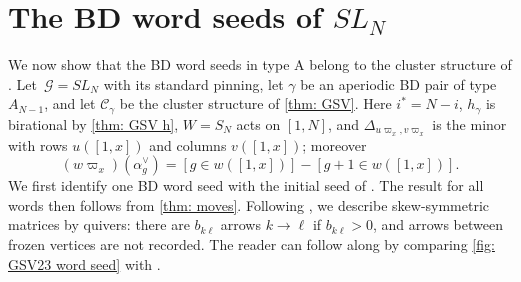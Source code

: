 \documentclass[a4paper]{amsart}
\numberwithin{equation}{section}
\theoremstyle{definition}
\theoremstyle{remark}
\newcommand{\mcG}{\mathcal{G}}
\newcommand{\mcC}{\mathcal{C}}
\begin{document}
\section{The BD word seeds of \texorpdfstring{$SL_N$}{SLN}}
\label{sec: type A}
We now show that the BD word seeds in type A belong to the cluster structure of \cite{GSV23}.
Let~$\mcG=SL_N$ with its standard pinning, let $\gamma$ be an aperiodic BD pair of type $A_{N-1}$, and let $\mcC_\gamma$ be the cluster structure of \cref{thm: GSV}.
Here $i^*=N-i$, $h_\gamma$ is birational by \cref{thm: GSV h}, $W=S_N$ acts on $[1,N]$, and $\Delta_{u\varpi_x,v\varpi_x}$ is the minor with rows $u([1,x])$ and columns $v([1,x])$; moreover
\begin{equation}
  \label{eq: pairing A}
  (w\varpi_x)(\alpha^\vee_g)=[g\in w([1,x])]-[g+1\in w([1,x])].
\end{equation}
We first identify one BD word seed with the initial seed of \cite{GSV23}.
The result for all words then follows from \cref{thm: moves}.
Following \cite{GSV23}, we describe skew-symmetric matrices by quivers: there are $b_{k\ell}$ arrows $k\to\ell$ if $b_{k\ell}>0$, and arrows between frozen vertices are not recorded.
The reader can follow along by comparing \cref{fig: GSV23 word seed} with \cite[Figure~6]{GSV23}.
\end{document}
